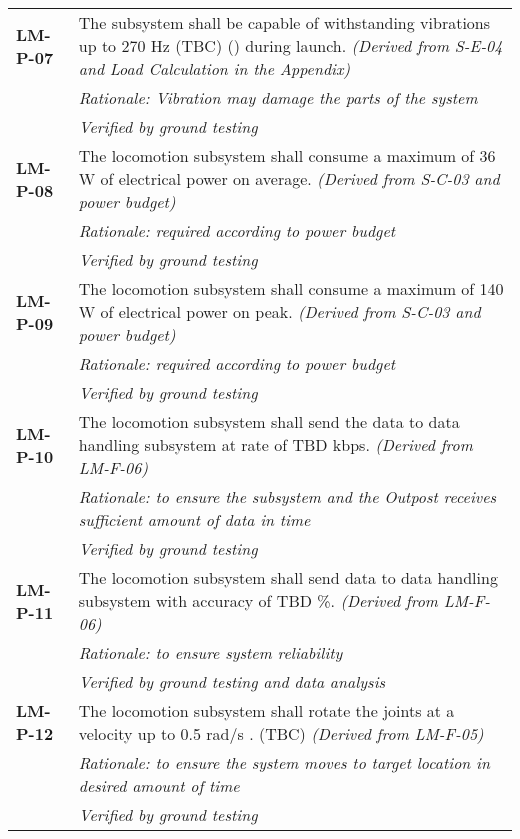 \begin{longtable}{P{2cm}P{13.75cm}}
\textbf{LM-P-07}	&
The subsystem shall be capable of withstanding vibrations up to 270 \gls{Hz} (\gls{TBC}) () during launch.
\textit{(Derived from S-E-04 and Load Calculation in the Appendix)}	\\
& \textit{Rationale: Vibration may damage the parts of the system} \\
& \textit{Verified by ground testing}	\\

\textbf{LM-P-08}	&
The locomotion subsystem shall consume a maximum of 36 \gls{W} of electrical power on average.
\textit{(Derived from S-C-03 and power budget)}	\\
& \textit{Rationale: required according to power budget} \\
& \textit{Verified by ground testing}	\\

\textbf{LM-P-09}	&
The locomotion subsystem shall consume a maximum of 140 \gls{W} of electrical power on peak. 
\textit{(Derived from S-C-03 and power budget)}	\\
& \textit{Rationale: required according to power budget} \\
&  \textit{Verified by ground testing}	\\

\textbf{LM-P-10}	&
The locomotion subsystem shall send the data to data handling subsystem at rate of \gls{TBD} \gls{kbps}. 
\textit{(Derived from LM-F-06)}	\\
& \textit{Rationale: to ensure the subsystem and the Outpost receives sufficient amount of data in time} \\
& \textit{Verified by ground testing}	\\

\textbf{LM-P-11}	& The locomotion subsystem shall send data to data handling subsystem with accuracy of \gls{TBD} \%. 
\textit{(Derived from LM-F-06)}	\\
& \textit{Rationale: to ensure system reliability} \\
& \textit{Verified by ground testing and data analysis}	\\
\textbf{LM-P-12}	& The locomotion subsystem shall rotate the joints at a velocity up to 0.5 \gls{rad/s} \cite{ERAjoint}. (\gls{TBC}) \textit{(Derived from LM-F-05)} \\
 &	\textit{Rationale: to ensure the system moves to target location in desired amount of time} \\
 &	\textit{Verified by ground testing}	\\


\end{longtable}
